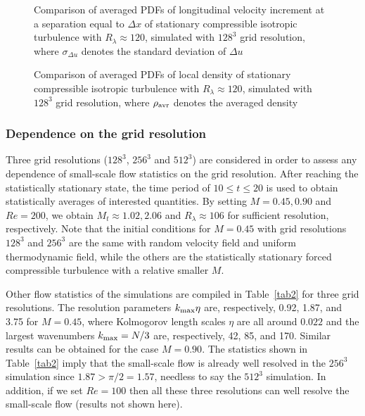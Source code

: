\documentclass[review]{elsarticle}
\begin{document}
\begin{figure}
  \centering
  \caption{Comparison of averaged PDFs of longitudinal velocity increment at a separation equal to $\Delta x$ of stationary compressible isotropic turbulence with $R_\lambda \approx 120$, simulated with $128^3$ grid resolution, where $\sigma_{\Delta u}$ denotes the standard deviation of $\Delta u$}
  \label{fig.velM07}
\end{figure}

\begin{figure}
  \centering
  \caption{Comparison of averaged PDFs of local density of stationary compressible isotropic turbulence with $R_\lambda \approx 120$, simulated with $128^3$ grid resolution, where $\rho_{\rm avr}$ denotes the averaged density}
  \label{fig.rhoM07}
\end{figure}


\subsubsection{Dependence on the grid resolution}

Three grid resolutions ($128^3$, $256^3$ and $512^3$) are considered in order to assess any dependence of small-scale flow statistics on the grid resolution. After reaching the statistically stationary state, the time period of $10 \le  t \le 20$ is used to obtain statistically averages of interested quantities. By setting $M=0.45, 0.90$ and $Re=200$, we obtain $M_t \approx 1.02, 2.06$ and $R_\lambda \approx 106$ for sufficient resolution, respectively. Note that the initial conditions for $M = 0.45$ with grid resolutions $128^3$ and $256^3$ are the same with random velocity field and uniform thermodynamic field, while the others are the statistically stationary forced compressible turbulence with a relative smaller $M$.

Other flow statistics of the simulations are compiled in Table~\ref{tab2} for three grid resolutions. The resolution parameters $k_{\rm max} \eta$ are, respectively, 0.92, 1.87, and 3.75 for $M = 0.45$, where Kolmogorov length scales $\eta$ are all around $0.022$ and the largest wavenumbers $k_{\rm max} = N/3$ are, respectively, 42, 85, and 170. Similar results can be obtained for the case $M = 0.90$. The statistics shown in Table~\ref{tab2} imply that the small-scale flow is already well resolved in the $256^3$ simulation since $1.87 > \pi/2 = 1.57$, needless to say the $512^3$ simulation. In addition, if we set $Re=100$ then all these three resolutions can well resolve the small-scale flow (results not shown here).
\end{document}

